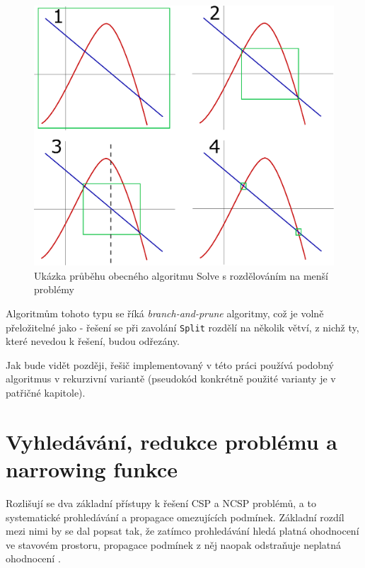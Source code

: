 \begin{figure}
\label{img:solving}
\centering
\includegraphics[scale=.7]{img/solving.eps}
\caption{Ukázka průběhu obecného algoritmu Solve s rozdělováním na menší problémy}
\end{figure}



Algoritmům tohoto typu se říká \emph{branch-and-prune} algoritmy, což je volně přeložitelné jako  - řešení se při zavolání \verb|Split| rozdělí na několik větví, z nichž ty, které nevedou k řešení, budou odřezány.

Jak bude vidět později, řešič implementovaný v této práci používá podobný algoritmus v rekurzivní variantě (pseudokód konkrétně použité varianty je v patřičné kapitole).








\section{Vyhledávání, redukce problému a narrowing funkce}
\label{ch:searchReduction}
Rozlišují se dva základní přístupy k řešení CSP a NCSP problémů, a to systematické prohledávání a propagace omezujících podmínek. Základní rozdíl mezi nimi by se dal popsat tak, že zatímco prohledávání hledá platná ohodnocení ve stavovém prostoru, propagace podmínek z něj naopak odstraňuje neplatná ohodnocení \cite{Vu2005}.

